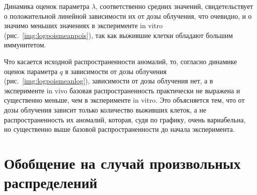 \documentclass{math-mech-sci}
\begin{document}
	Динамика оценок параметра $\lambda$,  соответственно средних значений, свидетельствует о положительной линейной зависимости их от дозы облучения, что очевидно, и о значимо меньших значениях в эксперименте in vitro (рис.~\ref{img:logpoismeanpois}), так как выжившие клетки обладают большим иммунитетом. 
	
	Что касается исходной распространенности аномалий, то, согласно динамике оценок параметра $q$  в зависимости от дозы облучения (рис.~\ref{img:logpoismeanlog}), зависимости от дозы облучения нет, а в эксперименте in vivo базовая распространенность практически не выражена и существенно меньше, чем в эксперименте in vitro. Это объясняется тем, что от дозы облучения зависит только количество выживших клеток, а не распространенность их аномалий, которая, судя по графику,   очень вариабельна, но существенно выше базовой распространенности до начала эксперимента.
	
	\section{Обобщение на случай произвольных распределений}
	
\end{document}
